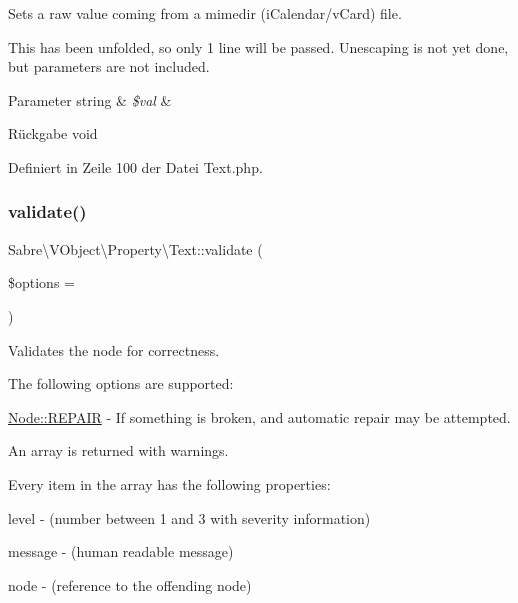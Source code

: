 Sets a raw value coming from a mimedir (i\+Calendar/v\+Card) file.

This has been \textquotesingle{}unfolded\textquotesingle{}, so only 1 line will be passed. Unescaping is not yet done, but parameters are not included.


\begin{DoxyParams}[1]{Parameter}
string & {\em \$val} & \\
\hline
\end{DoxyParams}
\begin{DoxyReturn}{Rückgabe}
void 
\end{DoxyReturn}


Definiert in Zeile 100 der Datei Text.\+php.

\mbox{\label{class_sabre_1_1_v_object_1_1_property_1_1_text_ad0e89eee693a2436d713a74bbe7468b8}} 
\subsubsection{\texorpdfstring{validate()}{validate()}}
{\footnotesize\ttfamily Sabre\textbackslash{}\+V\+Object\textbackslash{}\+Property\textbackslash{}\+Text\+::validate (\begin{DoxyParamCaption}\item[{}]{\$options = {} }\end{DoxyParamCaption})}

Validates the node for correctness.

The following options are supported\+:
\begin{DoxyItemize}
\item \mbox{\hyperlink{class_sabre_1_1_v_object_1_1_node_ac97a7fb85c1f871523336cd1ec6b29a9}{Node\+::\+R\+E\+P\+A\+IR}} -\/ If something is broken, and automatic repair may be attempted.
\end{DoxyItemize}

An array is returned with warnings.

Every item in the array has the following properties\+:
\begin{DoxyItemize}
\item level -\/ (number between 1 and 3 with severity information)
\item message -\/ (human readable message)
\item node -\/ (reference to the offending node)
\end{DoxyItemize}


